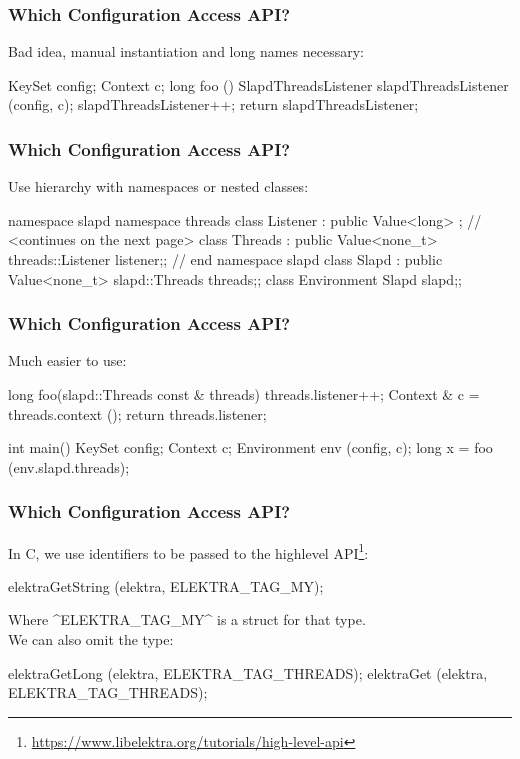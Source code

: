 \begin{frame}[fragile]
	\frametitle{Which Configuration Access API?}

	Bad idea, manual instantiation and long names necessary:
	\\[1em]
	\begin{code}[gobble=4,language=Cpp]
	KeySet config;
	Context c;
	long foo ()
	{
		SlapdThreadsListener slapdThreadsListener (config, c);
		slapdThreadsListener++;
		return slapdThreadsListener;
	}
	\end{code}
\end{frame}

\begin{frame}[fragile]
	\frametitle{Which Configuration Access API?}

	Use hierarchy with namespaces or nested classes:
	\\[1em]
	\begin{code}[gobble=4,language=Cpp]
	namespace slapd
	{
	namespace threads
	{
	class Listener : public Value<long> {};
	}  // <continues on the next page>
	class Threads : public Value<none_t>
	{threads::Listener listener;};
	}  // end namespace slapd
	class Slapd : public Value<none_t>
	{slapd::Threads threads;};
	class Environment {Slapd slapd;};
	\end{code}
\end{frame}

\begin{frame}[fragile]
	\frametitle{Which Configuration Access API?}

	Much easier to use:
	\begin{code}[gobble=4,language=Cpp]
	long foo(slapd::Threads const & threads)
	{
		threads.listener++;
		Context & c = threads.context ();
		return threads.listener;
	}

	int main()
	{
		KeySet config;
		Context c;
		Environment env (config, c);
		long x = foo (env.slapd.threads);
	}
	\end{code}
\end{frame}

\begin{frame}[fragile]
	\frametitle{Which Configuration Access API?}

	In C, we use identifiers to be passed to the highlevel API\footnote{\url{https://www.libelektra.org/tutorials/high-level-api}}:
	\\[2em]
	\begin{code}[gobble=4,language=Cpp]
	elektraGetString (elektra, ELEKTRA_TAG_MY);
	\end{code}
	Where ^ELEKTRA_TAG_MY^ is a struct for that type.
	\\[2em]

	We can also omit the type:
	\begin{code}[gobble=4,language=Cpp]
	elektraGetLong (elektra, ELEKTRA_TAG_THREADS);
	elektraGet (elektra, ELEKTRA_TAG_THREADS);
	\end{code}
\end{frame}

